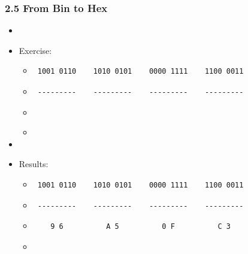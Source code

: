 \begin{frame}[fragile]
  \frametitle{2.5 From Bin to Hex}
    \begin{itemize}
        \item[]
        \item[] Exercise:
            \begin{itemize}
                \item[] \begin{verbatim} 1001 0110    1010 0101    0000 1111    1100 0011\end{verbatim}
                \item[] \begin{verbatim} ---------    ---------    ---------    ---------\end{verbatim}
                \item[] \begin{verbatim}                                                 \end{verbatim}
                \item[] 
            \end{itemize}
        \item[]
        \item[] Results:
            \begin{itemize}
                \item[] \begin{verbatim} 1001 0110    1010 0101    0000 1111    1100 0011\end{verbatim}
                \item[] \begin{verbatim} ---------    ---------    ---------    ---------\end{verbatim}
                \item[] \begin{verbatim}    9 6          A 5          0 F          C 3   \end{verbatim}
                \item[] 
            \end{itemize}
    \end{itemize}
\end{frame}


